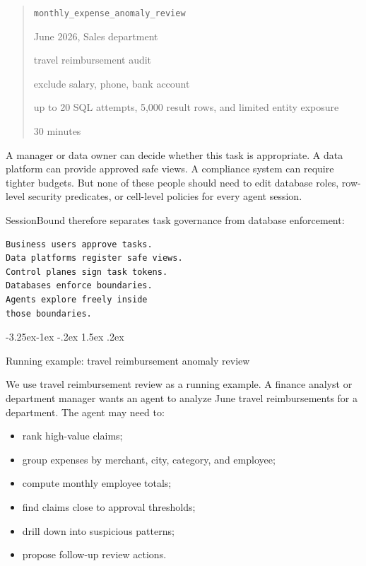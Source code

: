 \documentclass[10pt,twocolumn]{article}
\makeatletter
\providecommand{\tightlist}{%
  \setlength{\itemsep}{0pt}\setlength{\parskip}{0pt}}
\renewcommand\subsection{\@startsection{subsection}{2}{\z@}%
  {-3.25ex\@plus -1ex \@minus -.2ex}%
  {1.5ex \@plus .2ex}%
  {\normalfont\large\bfseries\raggedright}}
\makeatother
\begin{document}
\begin{quote}
\begin{description}
\tightlist
\item[Task type:]
{\scriptsize\texttt{monthly\_expense\_anomaly\_review}}
\item[Scope:]
June 2026, Sales department
\item[Purpose:]
travel reimbursement audit
\item[Sensitivity:]
exclude salary, phone, bank account
\item[Budget:]
up to 20 SQL attempts, 5,000 result rows, and limited entity exposure
\item[TTL:]
30 minutes
\end{description}
\end{quote}

A manager or data owner can decide whether this task is appropriate. A
data platform can provide approved safe views. A compliance system can
require tighter budgets. But none of these people should need to edit
database roles, row-level security predicates, or cell-level policies
for every agent session.

SessionBound therefore separates task governance from database
enforcement:

\begin{verbatim}
Business users approve tasks.
Data platforms register safe views.
Control planes sign task tokens.
Databases enforce boundaries.
Agents explore freely inside
those boundaries.
\end{verbatim}

\hypertarget{running-example-travel-reimbursement-anomaly-review}{%
\subsection{Running example: travel reimbursement anomaly
review}\label{running-example-travel-reimbursement-anomaly-review}}

We use travel reimbursement review as a running example. A finance
analyst or department manager wants an agent to analyze June travel
reimbursements for a department. The agent may need to:

\begin{itemize}
\tightlist
\item
  rank high-value claims;
\item
  group expenses by merchant, city, category, and employee;
\item
  compute monthly employee totals;
\item
  find claims close to approval thresholds;
\item
  drill down into suspicious patterns;
\item
  propose follow-up review actions.
\end{itemize}
\end{document}
